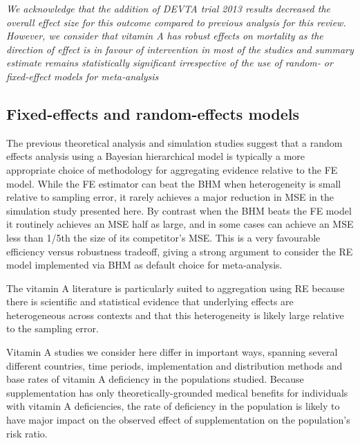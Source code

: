 \documentclass[12pt]{article}
\begin{document}
\textit{We acknowledge that the addition of DEVTA trial 2013 results decreased the overall effect size for this outcome compared to previous analysis for this review. However, we consider that vitamin A has robust effects on mortality as the direction of effect is in favour of intervention in most of the studies and summary estimate remains statistically significant irrespective of the use of random‐ or fixed‐effect models for meta‐analysis}



\subsection{Fixed-effects and random-effects models}

The previous theoretical analysis and simulation studies suggest that a random effects analysis using a Bayesian hierarchical model is typically a more appropriate choice of methodology for aggregating evidence relative to the FE model. While the FE estimator can beat the BHM when heterogeneity is small relative to sampling error, it rarely achieves a major reduction in MSE in the simulation study presented here. By contrast when the BHM beats the FE model it routinely achieves an MSE half as large, and in some cases can achieve an MSE less than 1/5th the size of its competitor's MSE. This is a very favourable efficiency versus robustness tradeoff, giving a strong argument to consider the RE model implemented via BHM as default choice for meta-analysis. 

The vitamin A literature is particularly suited to aggregation using RE because there is scientific and statistical evidence that underlying effects are heterogeneous across contexts and that this heterogeneity is likely large relative to the sampling error. 

Vitamin A studies we consider here differ in important ways, spanning several different countries, time periods, implementation and distribution methods and base rates of vitamin A deficiency in the populations studied. Because supplementation has only theoretically-grounded medical benefits for individuals with vitamin A deficiencies, the rate of deficiency in the population is likely to have major impact on the observed effect of supplementation on the population's risk ratio. 
\end{document}
